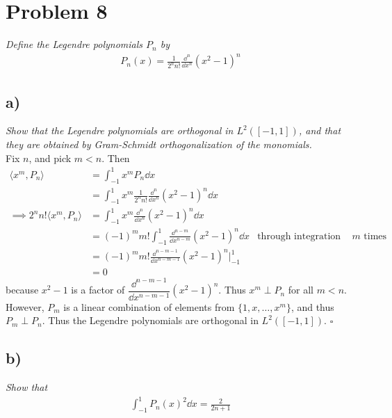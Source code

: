 \documentclass[12pt]{article}
\theoremstyle{plain}
\begin{document}
\section*{Problem 8}
\emph{Define the Legendre polynomials $P_n$ by}
\begin{align*}
    P_n(x) = \frac{1}{2^n n!}\frac{\dd^n}{\dd x^n}(x^2 - 1)^n
\end{align*}

\subsection*{ a)}
\emph{Show that the Legendre polynomials are orthogonal in $L^2([-1,1])$, and that they are obtained by Gram-Schmidt orthogonalization of the monomials.} \\

Fix $n$, and pick $m < n$.  Then
\begin{align*}
    \langle x^m, P_n \rangle &= \int_{-1}^1 x^m P_n \dd x \\
    &= \int_{-1}^1 x^m \frac{1}{2^n n!} \frac{\dd^n}{\dd x^n} (x^2 - 1)^n \dd x \\
    \implies 2^n n! \langle x^m, P_n \rangle &= \int_{-1}^1 x^m\frac{\dd^n}{\dd x^n}(x^2 - 1)^n \dd x \\
    &= (-1)^m m! \int_{-1}^1\frac{\dd^{n-m}}{\dd x^{n-m}} (x^2 - 1)^n \dd x & \text{through integration by parts $m$ times} \\
    &= (-1)^m m! \frac{\dd^{n-m-1}}{\dd x^{n-m-1}}(x^2 - 1)^n\Big|_{-1}^1 \\
    &= 0
\end{align*}
because $x^2 - 1$ is a factor of $\dfrac{\dd^{n-m-1}}{\dd x^{n-m-1}}(x^2 - 1)^n$.  Thus $x^m \perp P_n$ for all $m < n$.  However, $P_m$ is a linear combination of elements from $\{1, x, \dots, x^m\}$, and thus $P_m \perp P_n$.  Thus the Legendre polynomials are orthogonal in $L^2([-1,1])$. \hfill $\square$

\subsection*{ b)}
\emph{Show that}
\begin{align*}
    \int_{-1}^1 P_n(x)^2\dd x = \frac{2}{2n + 1}
\end{align*}
\end{document}
